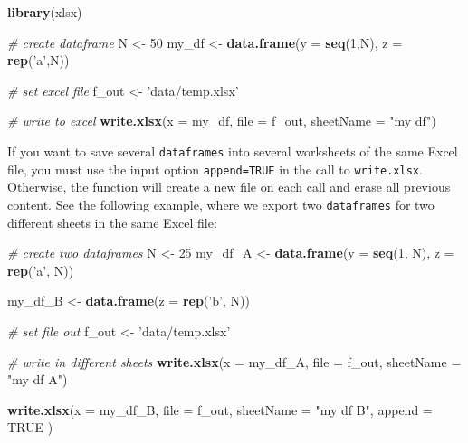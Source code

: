 \documentclass[
  12pt,
]{book}
\newenvironment{Shaded}{\begin{snugshade}}{\end{snugshade}}
\newcommand{\CommentTok}[1]{\textcolor[rgb]{0.37,0.37,0.37}{\textit{#1}}}
\newcommand{\DataTypeTok}[1]{\textcolor[rgb]{0.27,0.27,0.27}{#1}}
\newcommand{\DecValTok}[1]{\textcolor[rgb]{0.06,0.06,0.06}{#1}}
\newcommand{\KeywordTok}[1]{\textcolor[rgb]{0.27,0.27,0.27}{\textbf{#1}}}
\newcommand{\NormalTok}[1]{#1}
\newcommand{\OtherTok}[1]{\textcolor[rgb]{0.37,0.37,0.37}{#1}}
\newcommand{\StringTok}[1]{\textcolor[rgb]{0.5,0.5,0.5}{#1}}
\begin{document}
\begin{Shaded}
\begin{Highlighting}[]
\KeywordTok{library}\NormalTok{(xlsx)}

\CommentTok{# create dataframe}
\NormalTok{N <-}\StringTok{ }\DecValTok{50}
\NormalTok{my_df <-}\StringTok{ }\KeywordTok{data.frame}\NormalTok{(}\DataTypeTok{y =} \KeywordTok{seq}\NormalTok{(}\DecValTok{1}\NormalTok{,N), }\DataTypeTok{z =} \KeywordTok{rep}\NormalTok{(}\StringTok{'a'}\NormalTok{,N))}

\CommentTok{# set excel file}
\NormalTok{f_out <-}\StringTok{ 'data/temp.xlsx'}

\CommentTok{# write to excel}
\KeywordTok{write.xlsx}\NormalTok{(}\DataTypeTok{x =}\NormalTok{ my_df, }\DataTypeTok{file =}\NormalTok{ f_out, }\DataTypeTok{sheetName =} \StringTok{"my df"}\NormalTok{)}
\end{Highlighting}
\end{Shaded}

If you want to save several \texttt{dataframes} into several worksheets of the same Excel file, you must use the input option \texttt{append=TRUE} in the call to \texttt{write.xlsx}. Otherwise, the function will create a new file on each call and erase all previous content. See the following example, where we export two \texttt{dataframes} for two different sheets in the same Excel file: 

\begin{Shaded}
\begin{Highlighting}[]
\CommentTok{# create two dataframes}
\NormalTok{N <-}\StringTok{ }\DecValTok{25}
\NormalTok{my_df_A <-}\StringTok{ }\KeywordTok{data.frame}\NormalTok{(}\DataTypeTok{y =} \KeywordTok{seq}\NormalTok{(}\DecValTok{1}\NormalTok{, N), }
                      \DataTypeTok{z =} \KeywordTok{rep}\NormalTok{(}\StringTok{'a'}\NormalTok{, N))}

\NormalTok{my_df_B <-}\StringTok{ }\KeywordTok{data.frame}\NormalTok{(}\DataTypeTok{z =} \KeywordTok{rep}\NormalTok{(}\StringTok{'b'}\NormalTok{, N))}

\CommentTok{# set file out}
\NormalTok{f_out <-}\StringTok{ 'data/temp.xlsx'}

\CommentTok{# write in different sheets}
\KeywordTok{write.xlsx}\NormalTok{(}\DataTypeTok{x =}\NormalTok{ my_df_A, }
           \DataTypeTok{file =}\NormalTok{ f_out, }
           \DataTypeTok{sheetName =} \StringTok{"my df A"}\NormalTok{)}

\KeywordTok{write.xlsx}\NormalTok{(}\DataTypeTok{x =}\NormalTok{ my_df_B, }
           \DataTypeTok{file =}\NormalTok{ f_out, }
           \DataTypeTok{sheetName =} \StringTok{"my df B"}\NormalTok{, }
           \DataTypeTok{append =} \OtherTok{TRUE}\NormalTok{ )}
\end{Highlighting}
\end{Shaded}
\end{document}
